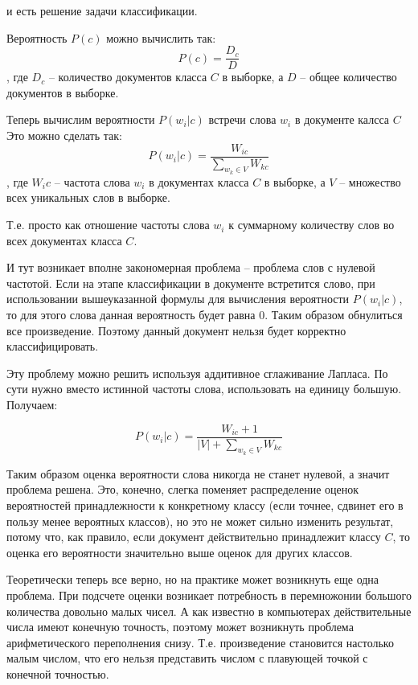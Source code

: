 \documentclass[12pt,a4paper]{scrartcl}
\begin{document}
и есть решение задачи классификации.

Вероятность $P(c)$ можно вычислить так:
\begin{equation*}
    P(c) = \frac{D_c}{D}
\end{equation*}
, где $D_c$ -- количество документов класса $C$ в выборке, а $D$ -- общее количество документов в выборке. 

Теперь вычислим вероятности $P(w_i|c)$ встречи слова $w_i$ в документе калсса $C$ Это можно сделать так:
\begin{equation*}
    P(w_i|c) = \frac{W_{ic}}{\sum\limits_{w_k \in V} W_{kc}}
\end{equation*}
, где $W_ic$ -- частота слова $w_i$ в документах класса $C$ в выборке, а $V$ -- множество всех уникальных слов в выборке.

Т.е. просто как отношение частоты слова $w_i$ к суммарному количеству слов во всех документах класса $C$.

И тут возникает вполне закономерная проблема -- проблема слов с нулевой частотой. Если на этапе классификации в документе встретится слово, при использовании вышеуказанной формулы для вычисления вероятности $P(w_i|c)$, то для этого слова данная вероятность будет равна 0. Таким образом обнулиться все произведение. Поэтому данный документ нельзя будет корректно классифицировать.

Эту проблему можно решить используя аддитивное сглаживание Лапласа. По сути нужно вместо истинной частоты слова, использовать на единицу большую. Получаем:

\begin{equation*}
    P(w_i|c) = \frac{W_{ic} + 1}{|V| + \sum\limits_{w_k \in V} W_{kc}}
\end{equation*}

Таким образом оценка вероятности слова никогда не станет нулевой, а значит проблема решена. Это, конечно, слегка поменяет распределение оценок вероятностей принадлежности к конкретному классу (если точнее, сдвинет его в пользу менее вероятных классов), но это не может сильно изменить результат, потому что, как правило, если документ действительно принадлежит классу $C$, то оценка его вероятности значительно выше оценок для других классов. 

Теоретически теперь все верно, но на практике может возникнуть еще одна проблема. При подсчете оценки возникает потребность в перемножонии большого количества довольно малых чисел.
А как известно в компьютерах действительные числа имеют конечную точность, поэтому может возникнуть проблема арифметического переполнения снизу. Т.е. произведение становится настолько малым числом, что его нельзя представить числом с плавующей точкой с конечной точностью.
\end{document}
